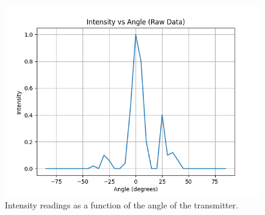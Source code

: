 \documentclass[10pt]{article}
\begin{document}
\begin{figure}
  \centering
  \includegraphics[scale=0.6]{plots/plot1.png}
  \caption{Intensity readings as a function of the angle of the transmitter.}
  \label{fig:3}
\end{figure}
\end{document}
